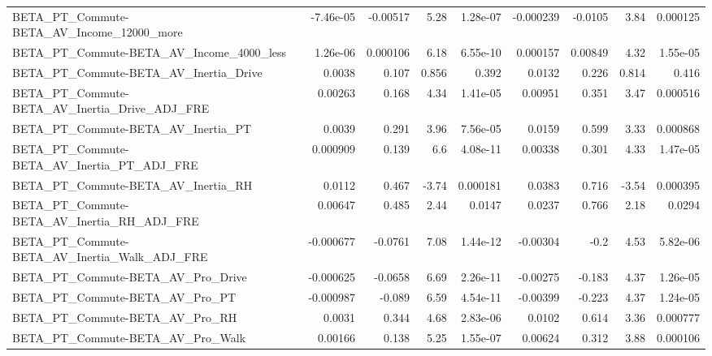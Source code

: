 \begin{tabular}{lrrrrrrrr}
BETA\_PT\_Commute-BETA\_AV\_Income\_12000\_more          &   -7.46e-05 &     -0.00517 &     5.28 & 1.28e-07 &  -0.000239 &     -0.0105 &         3.84 &      0.000125 \\
BETA\_PT\_Commute-BETA\_AV\_Income\_4000\_less           &    1.26e-06 &     0.000106 &     6.18 & 6.55e-10 &   0.000157 &     0.00849 &         4.32 &      1.55e-05 \\
BETA\_PT\_Commute-BETA\_AV\_Inertia\_Drive              &      0.0038 &        0.107 &    0.856 &    0.392 &     0.0132 &       0.226 &        0.814 &         0.416 \\
BETA\_PT\_Commute-BETA\_AV\_Inertia\_Drive\_ADJ\_FRE      &     0.00263 &        0.168 &     4.34 & 1.41e-05 &    0.00951 &       0.351 &         3.47 &      0.000516 \\
BETA\_PT\_Commute-BETA\_AV\_Inertia\_PT                 &      0.0039 &        0.291 &     3.96 & 7.56e-05 &     0.0159 &       0.599 &         3.33 &      0.000868 \\
BETA\_PT\_Commute-BETA\_AV\_Inertia\_PT\_ADJ\_FRE         &    0.000909 &        0.139 &      6.6 & 4.08e-11 &    0.00338 &       0.301 &         4.33 &      1.47e-05 \\
BETA\_PT\_Commute-BETA\_AV\_Inertia\_RH                 &      0.0112 &        0.467 &    -3.74 & 0.000181 &     0.0383 &       0.716 &        -3.54 &      0.000395 \\
BETA\_PT\_Commute-BETA\_AV\_Inertia\_RH\_ADJ\_FRE         &     0.00647 &        0.485 &     2.44 &   0.0147 &     0.0237 &       0.766 &         2.18 &        0.0294 \\
BETA\_PT\_Commute-BETA\_AV\_Inertia\_Walk\_ADJ\_FRE       &   -0.000677 &      -0.0761 &     7.08 & 1.44e-12 &   -0.00304 &        -0.2 &         4.53 &      5.82e-06 \\
BETA\_PT\_Commute-BETA\_AV\_Pro\_Drive                  &   -0.000625 &      -0.0658 &     6.69 & 2.26e-11 &   -0.00275 &      -0.183 &         4.37 &      1.26e-05 \\
BETA\_PT\_Commute-BETA\_AV\_Pro\_PT                     &   -0.000987 &       -0.089 &     6.59 & 4.54e-11 &   -0.00399 &      -0.223 &         4.37 &      1.24e-05 \\
BETA\_PT\_Commute-BETA\_AV\_Pro\_RH                     &      0.0031 &        0.344 &     4.68 & 2.83e-06 &     0.0102 &       0.614 &         3.36 &      0.000777 \\
BETA\_PT\_Commute-BETA\_AV\_Pro\_Walk                   &     0.00166 &        0.138 &     5.25 & 1.55e-07 &    0.00624 &       0.312 &         3.88 &      0.000106 \\

\end{tabular}
